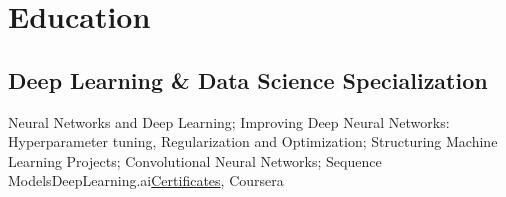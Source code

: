 \documentclass[10pt,a4paper,sans]{moderncv}
\begin{document}



\section{Education}    

\subsection{Deep Learning \& Data Science Specialization}


{Neural Networks and Deep Learning; Improving Deep Neural Networks: Hyperparameter tuning, Regularization and Optimization; Structuring Machine Learning Projects;
Convolutional Neural Networks; Sequence Models}{DeepLearning.ai}{\href{https://www.coursera.org/account/accomplishments/specialization/5VGBE56Q62GE}{Certificates}, Coursera}{}
\end{document}
